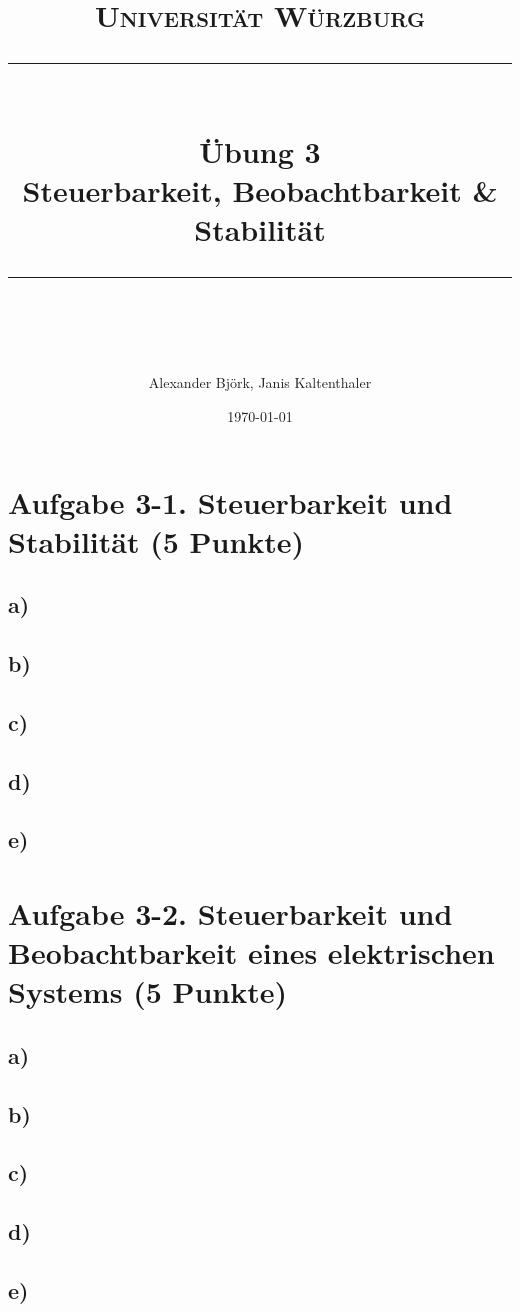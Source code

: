 \documentclass[11pt]{scrartcl} %
\title{	
	\normalfont\normalsize
	\textsc{Universität Würzburg}\\ %
	\vspace{25pt} %
	\rule{\linewidth}{0.5pt}\\ %
	\vspace{20pt} %
	{\huge Übung 3}\\ %
	{\Large Steuerbarkeit, Beobachtbarkeit \& Stabilität}\\
	\vspace{12pt} %
	\rule{\linewidth}{2pt}\\ %
	\vspace{12pt} %
}
\author{\LARGE Alexander Björk, Janis Kaltenthaler} %
\date{\normalsize\today} %
\begin{document}
\maketitle %


\section*{Aufgabe 3-1. Steuerbarkeit und Stabilität (5 Punkte)}
\subsection*{a)}
\subsection*{b)}
\subsection*{c)}
\subsection*{d)}
\subsection*{e)}


\section*{Aufgabe 3-2. Steuerbarkeit und Beobachtbarkeit eines elektrischen Systems (5 Punkte)}
\subsection*{a)}
\subsection*{b)}
\subsection*{c)}
\subsection*{d)}
\subsection*{e)}
\end{document}
